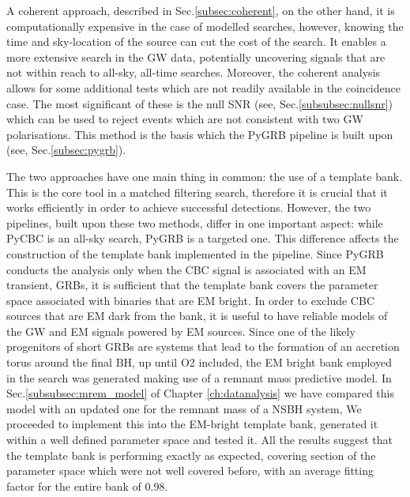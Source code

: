 \documentclass[binding=0.6cm, LaM]{sapthesis}
\begin{document}
        A coherent approach, described in Sec.\ref{subsec:coherent}, on the other hand,
        it is computationally expensive in the case of modelled searches,
        however, knowing the time and sky-location of the source can cut the cost of the search.
        It enables a more extensive search in the GW data, potentially uncovering signals
        that are not within reach to all-sky, all-time searches.
        Moreover, the coherent analysis allows for some additional tests
        which are not readily available in the coincidence case.
        The most significant of these is the null SNR (see, Sec.\ref{subsubsec:nullsnr}) which can be used to reject events which are
        not consistent with two GW polarisations.
        This method is the  basis which the  {\ttfamily PyGRB}  pipeline is built upon (see, Sec.\ref{subsec:pygrb}).

	The two approaches have one main thing in common: the use of a template bank.
	This is the core tool in a matched filtering search,  
	therefore it is crucial that it works efficiently in order to achieve successful detections.
	However, the two pipelines, built upon these two methods, differ in one important aspect: 
	while {\ttfamily PyCBC}  is an all-sky search, {\ttfamily PyGRB} is a targeted one.
	This difference affects the construction of the template bank implemented in the pipeline.
	Since {\ttfamily PyGRB} conducts the analysis only when the CBC signal is associated with an EM transient, GRBs,
	it is sufficient that the template bank covers the parameter space associated with binaries that are EM bright.
	In order to exclude CBC sources that are EM dark from the bank, 
	it is useful to have reliable models of the GW and EM signals powered by EM sources.
	Since one of the likely progenitors of short GRBs are systems that 
	lead to the formation of an accretion torus around the final BH,
	up until O2 included, the EM bright bank employed in the search 
	was generated making use of a remnant mass predictive model.
 	In Sec.\ref{subsubsec:mrem_model} of Chapter \ref{ch:datanalysis} we have compared this model \cite{50}
        with an updated one \cite{54} for the remnant mass of a NSBH system,
	We proceeded to implement this into the EM-bright template bank,
        generated  it within a well defined parameter space and tested it.
        All the results suggest that the template bank is performing exactly as expected,
        covering section of the parameter space which were not well covered before,
        with an average fitting factor for the entire bank of 0.98.

\backmatter
\cleardoublepage




\end{document}
